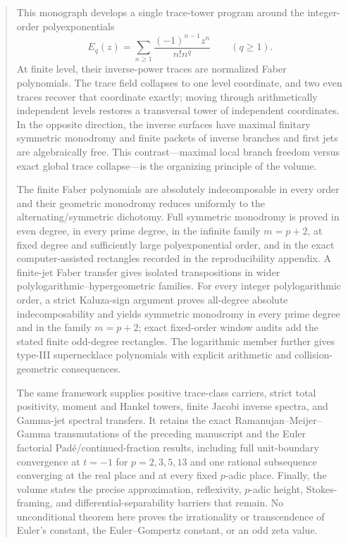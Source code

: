 \documentclass[11pt]{article}
\theoremstyle{keio}
\theoremstyle{definition}
\theoremstyle{remark}
\begin{document}
\begin{abstract}
This monograph develops a single trace-tower program around the integer-order
polyexponentials
\[
 E_q(z)=\sum_{n\ge1}\frac{(-1)^{n-1}z^n}{n!n^q}
 \qquad(q\ge1).
\]
At finite level, their inverse-power traces are normalized Faber polynomials.
The trace field collapses to one level coordinate, and two even traces recover
that coordinate exactly; moving through arithmetically independent levels
restores a transversal tower of independent coordinates.  In the opposite
direction, the inverse surfaces have maximal finitary symmetric monodromy and
finite packets of inverse branches and first jets are algebraically free.
This contrast---maximal local branch freedom versus exact global trace
collapse---is the organizing principle of the volume.

The finite Faber polynomials are absolutely indecomposable in every order and
their geometric monodromy reduces uniformly to the alternating/symmetric
dichotomy.  Full symmetric monodromy is proved in even degree, in every prime
degree, in the infinite family \(m=p+2\), at fixed degree and sufficiently
large polyexponential order, and in the exact computer-assisted rectangles
recorded in the reproducibility appendix.  A finite-jet Faber transfer gives
isolated transpositions in wider polylogarithmic--hypergeometric families.
For every integer polylogarithmic order, a strict Kaluza-sign argument proves
all-degree absolute indecomposability and yields symmetric monodromy in every
prime degree and in the family \(m=p+2\); exact fixed-order window audits add
the stated finite odd-degree rectangles.  The logarithmic member further
gives type-III supernecklace polynomials with explicit arithmetic and
collision-geometric consequences.

The same framework supplies positive trace-class carriers, strict total
positivity, moment and Hankel towers, finite Jacobi inverse spectra, and
Gamma-jet spectral transfers.  It retains the exact Ramanujan--Meijer--Gamma
transmutations of the preceding manuscript and the Euler factorial
Padé/continued-fraction results, including full unit-boundary convergence at
\(t=-1\) for \(p=2,3,5,13\) and one rational subsequence converging at the real
place and at every fixed \(p\)-adic place.  Finally, the volume states the
precise approximation, reflexivity, \(p\)-adic height, Stokes-framing, and
differential-separability barriers that remain.  No unconditional theorem
here proves the irrationality or transcendence of Euler's constant, the
Euler--Gompertz constant, or an odd zeta value.
\end{abstract}
\end{document}

